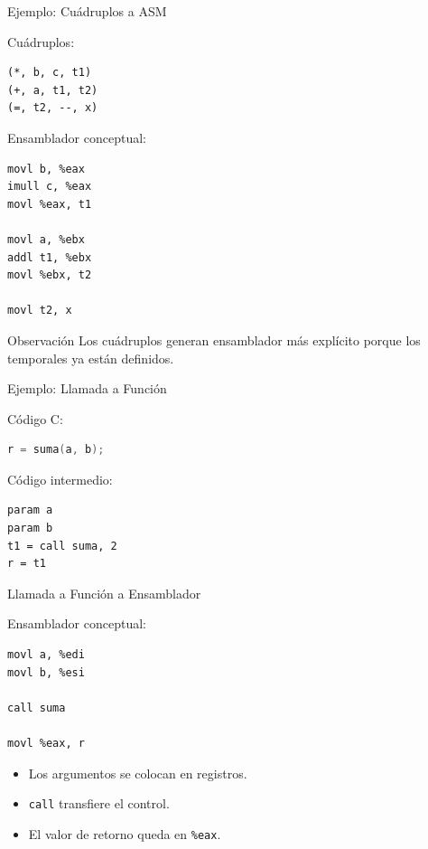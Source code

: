 \documentclass{beamer}
\begin{document}
\begin{frame}[fragile]{Ejemplo: Cuádruplos a ASM}

Cuádruplos:

\begin{lstlisting}
(*, b, c, t1)
(+, a, t1, t2)
(=, t2, --, x)
\end{lstlisting}

\vspace{0.3cm}

Ensamblador conceptual:

\begin{lstlisting}
movl b, %eax
imull c, %eax
movl %eax, t1

movl a, %ebx
addl t1, %ebx
movl %ebx, t2

movl t2, x
\end{lstlisting}

\vspace{0.3cm}

\begin{block}{Observación}
Los cuádruplos generan ensamblador más explícito porque los temporales ya están definidos.
\end{block}

\end{frame}

\begin{frame}[fragile]{Ejemplo: Llamada a Función}

Código C:

\begin{lstlisting}[language=C]
r = suma(a, b);
\end{lstlisting}

Código intermedio:

\begin{lstlisting}
param a
param b
t1 = call suma, 2
r = t1
\end{lstlisting}

\end{frame}

\begin{frame}[fragile]{Llamada a Función a Ensamblador}

Ensamblador conceptual:

\begin{lstlisting}
movl a, %edi
movl b, %esi

call suma

movl %eax, r
\end{lstlisting}

\vspace{0.3cm}

\begin{itemize}
    \item Los argumentos se colocan en registros.
    \item \texttt{call} transfiere el control.
    \item El valor de retorno queda en \texttt{\%eax}.
\end{itemize}

\end{frame}
\end{document}
